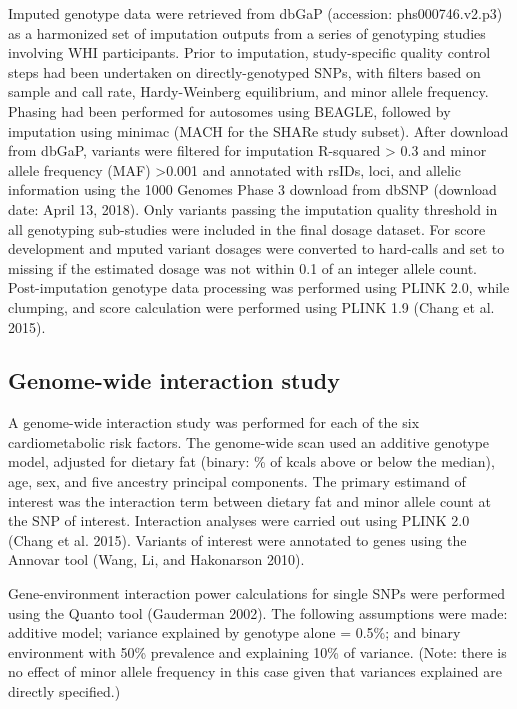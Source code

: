 \documentclass[]{article}
\begin{document}
Imputed genotype data were retrieved from dbGaP (accession:
phs000746.v2.p3) as a harmonized set of imputation outputs from a series
of genotyping studies involving WHI participants. Prior to imputation,
study-specific quality control steps had been undertaken on
directly-genotyped SNPs, with filters based on sample and call rate,
Hardy-Weinberg equilibrium, and minor allele frequency. Phasing had been
performed for autosomes using BEAGLE, followed by imputation using
minimac (MACH for the SHARe study subset). After download from dbGaP,
variants were filtered for imputation R-squared \textgreater{} 0.3 and
minor allele frequency (MAF) \textgreater{}0.001 and annotated with
rsIDs, loci, and allelic information using the 1000 Genomes Phase 3
download from dbSNP (download date: April 13, 2018). Only variants
passing the imputation quality threshold in all genotyping sub-studies
were included in the final dosage dataset. For score development and
mputed variant dosages were converted to hard-calls and set to missing
if the estimated dosage was not within 0.1 of an integer allele count.
Post-imputation genotype data processing was performed using PLINK 2.0,
while clumping, and score calculation were performed using PLINK 1.9
(Chang et al. 2015).

\hypertarget{genome-wide-interaction-study}{%
\subsection{Genome-wide interaction
study}\label{genome-wide-interaction-study}}

A genome-wide interaction study was performed for each of the six
cardiometabolic risk factors. The genome-wide scan used an additive
genotype model, adjusted for dietary fat (binary: \% of kcals above or
below the median), age, sex, and five ancestry principal components. The
primary estimand of interest was the interaction term between dietary
fat and minor allele count at the SNP of interest. Interaction analyses
were carried out using PLINK 2.0 (Chang et al. 2015). Variants of
interest were annotated to genes using the Annovar tool (Wang, Li, and
Hakonarson 2010).

Gene-environment interaction power calculations for single SNPs were
performed using the Quanto tool (Gauderman 2002). The following
assumptions were made: additive model; variance explained by genotype
alone = 0.5\%; and binary environment with 50\% prevalence and
explaining 10\% of variance. (Note: there is no effect of minor allele
frequency in this case given that variances explained are directly
specified.)
\end{document}
